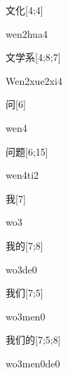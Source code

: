 \begin{verbete}{文化}[4;4]
\begin{pronuncia}{wen2hua4}
\end{pronuncia}
\end{verbete}

\begin{verbete}{文学系}[4;8;7]
\begin{pronuncia}{Wen2xue2xi4}
\end{pronuncia}
\end{verbete}

\begin{verbete}[wen4]{问}[6]
\begin{pronuncia}{wen4}
\end{pronuncia}
\end{verbete}

\begin{verbete}[wen4ti2]{问题}[6;15]
\begin{pronuncia}{wen4ti2}
\end{pronuncia}
\end{verbete}

\begin{verbete}[wo3]{我}[7]
\begin{pronuncia}{wo3}
\end{pronuncia}
\end{verbete}

\begin{verbete}[wo3de0]{我的}[7;8]
\begin{pronuncia}{wo3de0}
\end{pronuncia}
\end{verbete}

\begin{verbete}[wo3men0]{我们}[7;5]
\begin{pronuncia}{wo3men0}
\end{pronuncia}
\end{verbete}

\begin{verbete}[wo3men0de0]{我们的}[7;5;8]
\begin{pronuncia}{wo3men0de0}
\end{pronuncia}
\end{verbete}

